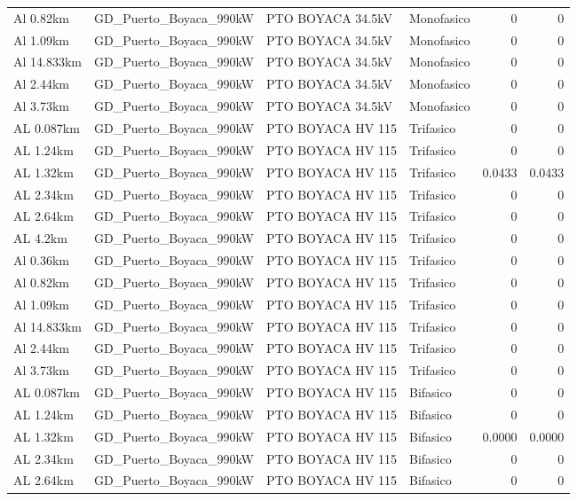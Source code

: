\documentclass[11pt,a4paper]{article}
\begin{document}
\begin{longtable}{llllrr}
Al 0.82km & GD\_Puerto\_Boyaca\_990kW & PTO BOYACA 34.5kV & Monofasico & 0 & 0 \\
Al 1.09km & GD\_Puerto\_Boyaca\_990kW & PTO BOYACA 34.5kV & Monofasico & 0 & 0 \\
Al 14.833km & GD\_Puerto\_Boyaca\_990kW & PTO BOYACA 34.5kV & Monofasico & 0 & 0 \\
Al 2.44km & GD\_Puerto\_Boyaca\_990kW & PTO BOYACA 34.5kV & Monofasico & 0 & 0 \\
Al 3.73km & GD\_Puerto\_Boyaca\_990kW & PTO BOYACA 34.5kV & Monofasico & 0 & 0 \\
AL 0.087km & GD\_Puerto\_Boyaca\_990kW & PTO BOYACA HV 115 & Trifasico & 0 & 0 \\
AL 1.24km & GD\_Puerto\_Boyaca\_990kW & PTO BOYACA HV 115 & Trifasico & 0 & 0 \\
AL 1.32km & GD\_Puerto\_Boyaca\_990kW & PTO BOYACA HV 115 & Trifasico & 0.0433 & 0.0433 \\
AL 2.34km & GD\_Puerto\_Boyaca\_990kW & PTO BOYACA HV 115 & Trifasico & 0 & 0 \\
AL 2.64km & GD\_Puerto\_Boyaca\_990kW & PTO BOYACA HV 115 & Trifasico & 0 & 0 \\
AL 4.2km & GD\_Puerto\_Boyaca\_990kW & PTO BOYACA HV 115 & Trifasico & 0 & 0 \\
Al 0.36km & GD\_Puerto\_Boyaca\_990kW & PTO BOYACA HV 115 & Trifasico & 0 & 0 \\
Al 0.82km & GD\_Puerto\_Boyaca\_990kW & PTO BOYACA HV 115 & Trifasico & 0 & 0 \\
Al 1.09km & GD\_Puerto\_Boyaca\_990kW & PTO BOYACA HV 115 & Trifasico & 0 & 0 \\
Al 14.833km & GD\_Puerto\_Boyaca\_990kW & PTO BOYACA HV 115 & Trifasico & 0 & 0 \\
Al 2.44km & GD\_Puerto\_Boyaca\_990kW & PTO BOYACA HV 115 & Trifasico & 0 & 0 \\
Al 3.73km & GD\_Puerto\_Boyaca\_990kW & PTO BOYACA HV 115 & Trifasico & 0 & 0 \\
AL 0.087km & GD\_Puerto\_Boyaca\_990kW & PTO BOYACA HV 115 & Bifasico & 0 & 0 \\
AL 1.24km & GD\_Puerto\_Boyaca\_990kW & PTO BOYACA HV 115 & Bifasico & 0 & 0 \\
AL 1.32km & GD\_Puerto\_Boyaca\_990kW & PTO BOYACA HV 115 & Bifasico & 0.0000 & 0.0000 \\
AL 2.34km & GD\_Puerto\_Boyaca\_990kW & PTO BOYACA HV 115 & Bifasico & 0 & 0 \\
AL 2.64km & GD\_Puerto\_Boyaca\_990kW & PTO BOYACA HV 115 & Bifasico & 0 & 0 \\

\end{longtable}
\end{document}
